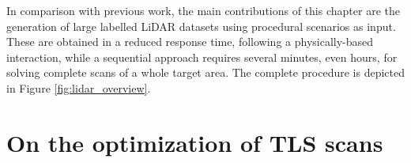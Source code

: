 In comparison with previous work, the main contributions of this chapter are the generation of large labelled LiDAR datasets using procedural scenarios as input. These are obtained in a reduced response time, following a physically-based interaction, while a sequential approach requires several minutes, even hours, for solving complete scans of a whole target area. The complete procedure is depicted in Figure \ref{fig:lidar_overview}. 

\section{On the optimization of TLS scans}

